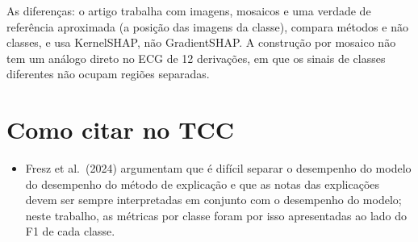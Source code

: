\documentclass[11pt,a4paper]{article}
\begin{document}
As diferenças: o artigo trabalha com imagens, mosaicos e uma verdade de referência aproximada (a posição das imagens da classe), compara métodos e não classes, e usa KernelSHAP, não GradientSHAP. A construção por mosaico não tem um análogo direto no ECG de 12 derivações, em que os sinais de classes diferentes não ocupam regiões separadas.

\section{Como citar no TCC}
\begin{itemize}
  \item Fresz et al.\ (2024) argumentam que é difícil separar o desempenho do modelo do desempenho do método de explicação e que as notas das explicações devem ser sempre interpretadas em conjunto com o desempenho do modelo; neste trabalho, as métricas por classe foram por isso apresentadas ao lado do F1 de cada classe.
\end{itemize}
\end{document}
